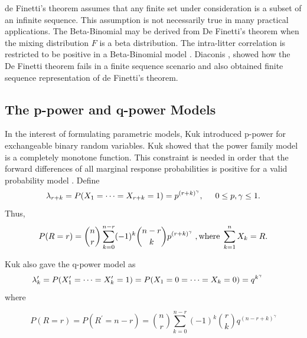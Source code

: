 \documentclass[12pt,oneside]{report}
\theoremstyle{definition}
\theoremstyle{mystyle}
\begin{document}
de Finetti's theorem assumes that any finite set under consideration is a subset of an infinite sequence. This assumption is not necessarily true in many practical applications. The Beta-Binomial may be derived from De Finetti's theorem  when  the mixing distribution $F$ is a  beta distribution. The intra-litter correlation is restricted to be  positive in a Beta-Binomial model \cite{bg}. Diaconis \cite{Diaconis1}, showed how the De Finetti theorem fails in a finite sequence scenario and also obtained  finite sequence representation of de Finetti's theorem.




\subsection{{The p-power and q-power Models}}
In the interest of formulating parametric models,  Kuk \cite{kuk2004} introduced    p-power  for exchangeable binary random variables. Kuk \cite{kuk2004} showed that the  power family model is a  completely monotone function. This constraint is needed in order that the forward differences of all  marginal response probabilities is positive for a valid probability model \cite{bg}.
Define
\begin{equation}\label{e1}
\lambda_{r+k}=P(X_{1}=\cdots=X_{r+k}=1)=p^{(r+k)^{\gamma}} ,\hspace{5mm}0\leq p,\gamma \leq 1.
\end{equation}
Thus,
\begin{equation}\label{e2}
P(R=r)=\displaystyle \binom{n}{r}\sum\limits_{k=0}^{n-r}(-1)^{k}\binom{n-r}{k}p^{(r+k)^{\gamma}}\hspace{1mm},\text{where}\hspace{1mm}\sum\limits_{k=1}^{n}X_{k}=R.
\end{equation}

Kuk also gave the q-power model as
\begin{equation}\label{e3}
\lambda_{k}^{\prime}=P(X_{1}^{\prime}=\cdots=X_{k}^{\prime}=1)=P(X_{1}=0=\cdots=X_{k}=0)=q^{k^{\gamma}} \hspace{5mm}
\end{equation}
where

\begin{equation} \label{e4q}
P(R=r)=P(R^{\prime}=n-r)=\displaystyle \binom{n}{r}\sum\limits_{k=0}^{n-r}(-1)^{k}\binom{r}{k}q^{(n-r+k)^{\gamma}}
\end{equation}
\end{document}
